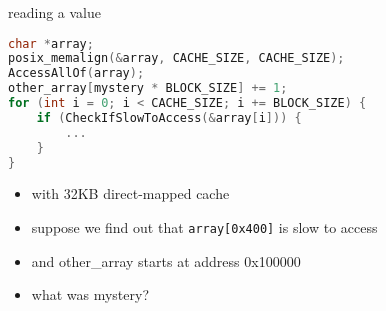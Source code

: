 \begin{frame}[fragile]{reading a value}
\begin{lstlisting}[language=C,style=smaller]
char *array;
posix_memalign(&array, CACHE_SIZE, CACHE_SIZE);
AccessAllOf(array);
other_array[mystery * BLOCK_SIZE] += 1;
for (int i = 0; i < CACHE_SIZE; i += BLOCK_SIZE) {
    if (CheckIfSlowToAccess(&array[i])) {
        ...
    }
}
\end{lstlisting}
\begin{itemize}
\item with 32KB direct-mapped cache
\item suppose we find out that \texttt{array[0x400]} is slow to access
\item and other\_array starts at address 0x100000
\item what was mystery?
\end{itemize}
\end{frame}
